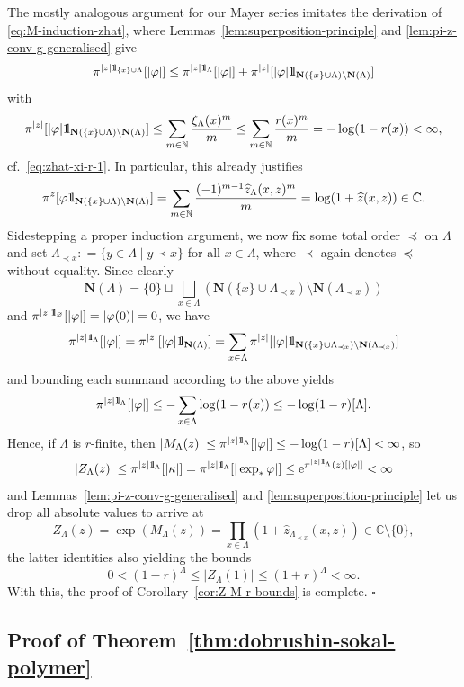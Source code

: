 \documentclass[10pt,a4paper]{amsart}
\newcommand{\e}{\mathrm{e}}
\newcommand{\N}{\mathbb{N}}
\newcommand{\C}{\mathbb{C}}
\def\1{{\mathchoice {1\mskip-4mu\mathrm l}      
{1\mskip-4mu\mathrm l}
{1\mskip-4.5mu\mathrm l} {1\mskip-5mu\mathrm l}}}
\begin{document}
The mostly analogous argument for our Mayer series imitates the derivation of \eqref{eq:M-induction-zhat}, where Lemmas~\ref{lem:superposition-principle} and \ref{lem:pi-z-conv-g-generalised} give
\[
	\pi^{|z| \1_{\{x\} \cup \Lambda}}[|\varphi|] \leq \pi^{|z| \1_\Lambda}[|\varphi|] + \pi^{|z|}[|\varphi| \1_{\mathbf N(\{x\} \cup \Lambda) \setminus \mathbf N(\Lambda)}]
\]
with
\[
	\pi^{|z|}[|\varphi| \1_{\mathbf N(\{x\} \cup \Lambda) \setminus \mathbf N(\Lambda)}] \leq \sum_{m \in \N} \frac{\xi_\Lambda(x)^m}{m} \leq \sum_{m \in \N} \frac{r(x)^m}{m} = - \log(1 - r(x)) < \infty,
\]
cf.\ \eqref{eq:zhat-xi-r-1}. 
In particular, this already justifies
\[
	\pi^{z}[\varphi \1_{\mathbf N(\{x\} \cup \Lambda) \setminus \mathbf N(\Lambda)}] = \sum_{m \in \N} \frac{(-1)^{m-1} \widehat z_\Lambda(x, z)^m}{m} = \log(1 + \widehat z(x, z)) \in \C.
\]
Sidestepping a proper induction argument, we now fix some total order $\preceq$ on $\Lambda$ and set $\Lambda_{\prec x} : = \{y \in \Lambda \mid y \prec x\}$ for all $x \in \Lambda$, where $\prec$ again denotes $\preceq$ without equality. 
Since clearly
\[
	\mathbf N(\Lambda) = \{0\} \sqcup \bigsqcup_{x \in \Lambda} (\mathbf N(\{x\} \cup \Lambda_{\prec x}) \setminus \mathbf N(\Lambda_{\prec x}))
\]
and $\pi^{|z| \1_\varnothing}[|\varphi|] = |\varphi(0)| = 0$, we have
\[
	\pi^{|z| \1_\Lambda}[|\varphi|] = \pi^{|z|}[|\varphi| \1_{\mathbf N(\Lambda)}] = \sum_{x \in \Lambda} \pi^{|z|}[|\varphi| \1_{\mathbf N(\{x\} \cup \Lambda_{\prec x}) \setminus \mathbf N(\Lambda_{\prec x})}]
\]
and bounding each summand according to the above yields
\[
	\pi^{|z| \1_\Lambda}[|\varphi|] \leq - \sum_{x \in \Lambda} \log(1 - r(x)) \leq - \log(1 - r)[\Lambda].
\]
Hence, if $\Lambda$ is $r$-finite, then $|M_\Lambda(z)| \leq \pi^{|z| \1_\Lambda}[|\varphi|] \leq - \log(1 - r)[\Lambda] < \infty$, so
\[
	|Z_\Lambda(z)| \leq \pi^{|z| \1_\Lambda}[|\kappa|] = \pi^{|z| \1_\Lambda}[|\exp_\ast \varphi|] \leq \e^{\pi^{|z| \1_\Lambda}(z)[|\varphi|]} 	< \infty
\]
and Lemmas~\ref{lem:pi-z-conv-g-generalised} and \ref{lem:superposition-principle} let us drop all absolute values to arrive at
\[
	Z_\Lambda(z) = \exp(M_\Lambda(z)) = \prod_{x \in \Lambda} (1 + \widehat z_{\Lambda_{\prec x}}(x, z)) \in \C \setminus \{0\},
\]
the latter identities also yielding the bounds
\[
	0 < (1 - r)^\Lambda \leq |Z_\Lambda(1)| \leq (1 + r)^\Lambda < \infty.
\]
With this, the proof of Corollary~\ref{cor:Z-M-r-bounds} is complete.
\hfill $\square$

\subsection{Proof of Theorem~\ref{thm:dobrushin-sokal-polymer}}
\end{document}
